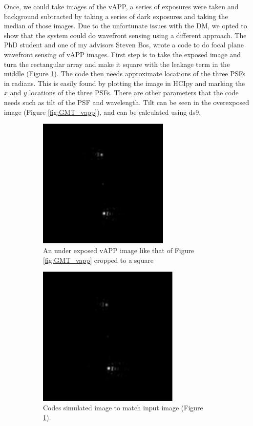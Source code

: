 Once, we could take images of the vAPP, a series of exposures were taken and background subtracted by taking a series of dark exposures and taking the median of those images.  Due to the unfortunate issues with the DM, we opted to show that the system could do wavefront sensing using a different approach.  The PhD student and one of my advisors Steven Bos, wrote a code to do focal plane wavefront sensing of vAPP images.  First step is to take the exposed image and turn the rectangular array and make it square with the leakage term in the middle (Figure \ref{fig:square_vapp}).  The code then needs approximate locations of the three PSFs in radians.  This is easily found by plotting the image in HCIpy and marking the $x$ and $y$ locations of the three PSFs.  There are other parameters that the code needs such as tilt of the PSF and wavelength.  Tilt can be seen in the overexposed image (Figure \ref{fig:GMT_vapp}), and can be calculated using ds9.

\begin{figure}[H]
\centering
\begin{subfigure}{.5\textwidth}
  \centering
  \includegraphics[width=6.5cm]{Figures/vapp_square.png}
  \caption{An under exposed vAPP image like that of Figure \ref{fig:GMT_vapp} cropped to a square}
  \label{fig:square_vapp}
\end{subfigure}%
\begin{subfigure}{.5\textwidth}
  \centering
  \includegraphics[width=7cm]{Figures/simulated_vapp.png}
  \caption{Codes simulated image to match input image (Figure \ref{fig:square_vapp}).}
  \label{fig:sim_square}
\end{subfigure}
\caption{}
\label{fig:code_images}
\end{figure}



